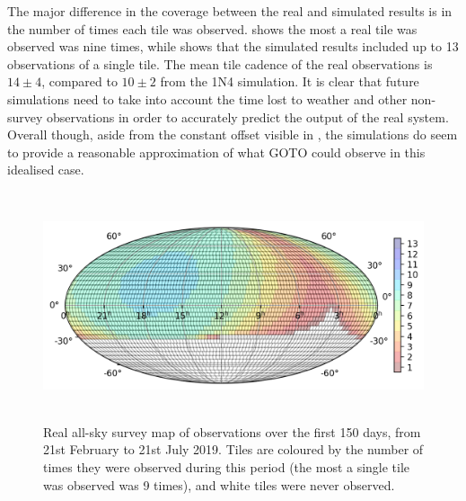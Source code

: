 \begin{colsection}
The major difference in the coverage between the real and simulated results is in the number of times each tile was observed.  shows the most a real tile was observed was nine times, while  shows that the simulated results included up to 13 observations of a single tile. The mean tile cadence of the real observations is $14\pm4$, compared to $10\pm2$ from the 1N4 simulation. It is clear that future simulations need to take into account the time lost to weather and other non-survey observations in order to accurately predict the output of the real system. Overall though, aside from the constant offset visible in , the simulations do seem to provide a reasonable approximation of what GOTO could observe in this idealised case.

\begin{figure}[p]
    \begin{center}
        \includegraphics[height=190pt]{images/survey_sims/150_1N4_real_v2.png}
    \end{center}
    \caption[Real survey observations over 150 days]{
        Real all-sky survey map of observations over the first 150 days, from 21st February to 21st July 2019. Tiles are coloured by the number of times they were observed during this period (the most a single tile was observed was 9 times), and white tiles were never observed.
    }\label{fig:survey_real_150}
\end{figure}


\end{colsection}
